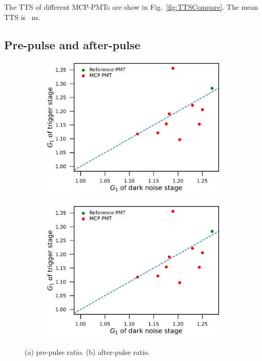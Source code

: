 The TTS of different MCP-PMTs are show in Fig.~\ref{fig:TTSCompare}. The mean TTS is \SI{}{ns}.


\subsection{Pre-pulse and after-pulse}
\begin{figure}[!htbp]
    \centering
    \begin{subfigure}[b]{0.49\textwidth}
        \includegraphics[width=\textwidth,page=11]{figures/result/compare.pdf}
        \caption{}
        \label{fig:prepulseCompare}
    \end{subfigure}
    \begin{subfigure}[b]{0.49\textwidth}
        \includegraphics[width=\textwidth,page=12]{figures/result/compare.pdf}
        \caption{}
        \label{fig:afterpulseCompare}
    \end{subfigure}
    \caption{(a) pre-pulse ratio. (b) after-pulse ratio.}
\end{figure}
